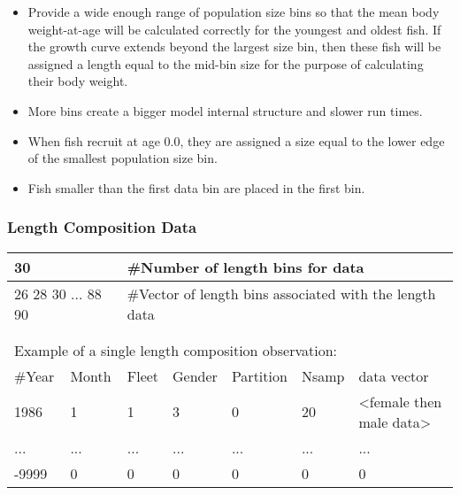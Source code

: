 \begin{description}
\begin{itemize}
		\item Provide a wide enough range of population size bins so that the mean body weight-at-age will be calculated correctly for the youngest and oldest fish.  If the growth curve extends beyond the largest size bin, then these fish will be assigned a length equal to the mid-bin size for the purpose of calculating their body weight.
		\item More bins create a bigger model internal structure and slower run times.
		\item When fish recruit at age 0.0, they are assigned a size equal to the lower edge of the smallest population size bin.
		\item Fish smaller than the first data bin are placed in the first bin.
	\end{itemize}
\end{description}

\subsubsection{Length Composition Data}
\begin{center}
	\begin{tabular}{p{1.5cm} p{1.5cm} p{1.5cm} p{1.5cm} p{1.5cm} p{1.5cm} p{5cm}}
		\hline
		\multicolumn{2}{l}{30} & \multicolumn{5}{l}{\#Number of length bins for data}\\
		\hline
		\multicolumn{2}{l}{26 28 30 ... 88 90} &  \multicolumn{5}{l}{\#Vector of length bins associated with the length data}\\
		\hline
		\\ \\
		\multicolumn{7}{l}{Example of a single length composition observation:} \\
		\hline
		\#Year & Month & Fleet & Gender & Partition & Nsamp & data vector\\
		\hline
		1986 & 1 & 1 & 3 & 0 & 20 & <female then male data> \\
		... & ...& ... & ... & ...& ... & ... \\
		-9999 & 0 & 0 & 0 & 0 & 0 & 0 \\
		\hline	
	\end{tabular}
\end{center}


